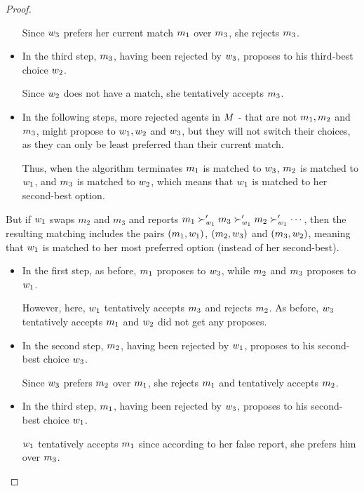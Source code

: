 \begin{proof}
\begin{itemize}
Since $w_3$ prefers her current match $m_1$ over $m_3$,  she rejects $m_3$.

\item In the third step, $m_3$, having been rejected by $w_3$, proposes to his third-best choice $w_2$.

Since $w_2$ does not have a match, she tentatively accepts $m_3$.


\item In the following steps, more rejected agents in $M$ - that are not $m_1, m_2$ and $m_3$, might propose to $w_1, w_2$ and $w_3$, but they will not switch their choices, as they can only be least preferred than their current match. 

Thus, when the algorithm terminates $m_1$ is matched to $w_3$, $m_2$ is matched to $w_1$, and $m_3$ is matched to $w_2$,
which means that $w_1$ is matched to her second-best option.
\end{itemize}

But if $w_1$ swaps $m_2$ and $m_3$ and reports $m_1 \succ'_{w_1} m_3 \succ'_{w_1} m_2 \succ'_{w_1} \cdots$, then the resulting matching includes the pairs $(m_1, w_1)$, $(m_2, w_3)$ and $(m_3, w_2)$, meaning that $w_1$ is matched to her most preferred option (instead of her second-best).
\begin{itemize}
\item In the first step, as before, $m_1$ proposes to $w_3$, while $m_2$ and $m_3$ proposes to $w_1$.

However, here,  $w_1$ tentatively accepts $m_3$ and rejects $m_2$.
As before, $w_3$ tentatively accepts $m_1$ and $w_2$ did not get any proposes.


\item In the second step, $m_2$, having been rejected by $w_1$, proposes to his second-best choice $w_3$.

Since $w_3$ prefers $m_2$ over $m_1$,  she rejects $m_1$ and tentatively accepts $m_2$.


\item In the third step, $m_1$, having been rejected by  $w_3$, proposes to his second-best choice $w_1$.

$w_1$ tentatively accepts $m_1$ since according to her false report, she prefers him over $m_3$.



\end{itemize}
\end{proof}
